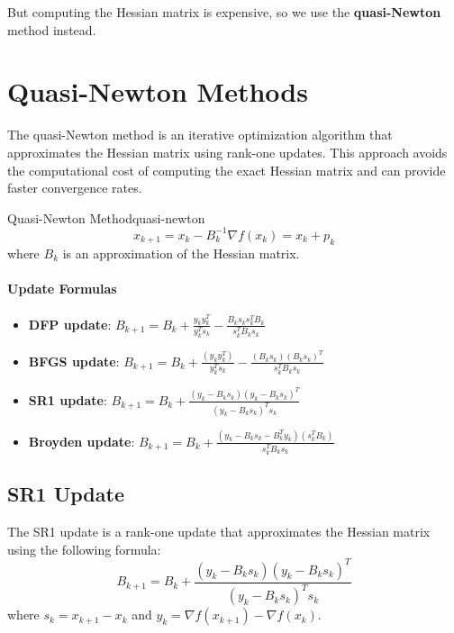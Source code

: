 But computing the Hessian matrix is expensive, so we use the \textbf{quasi-Newton} method instead.

\section*{Quasi-Newton Methods}
The quasi-Newton method is an iterative optimization algorithm that approximates the Hessian matrix using rank-one updates. 
This approach avoids the computational cost of computing the exact Hessian matrix and can provide faster convergence rates.
\begin{definition}{Quasi-Newton Method}{quasi-newton}
    \[
    x_{k+1} = x_k - B_k^{-1} \nabla f(x_k) = x_k + p_k
    \]
    where \( B_k \) is an approximation of the Hessian matrix.
\end{definition}

\begin{algorithm}[H]
  \caption{Quasi-Newton Method}
  \label{alg:quasi-newton}
  \;
  \;
\end{algorithm}

\paragraph{Update Formulas}

\begin{itemize}
  \item \textbf{DFP update}: \( B_{k+1} = B_k + \frac{y_k y_k^T}{y_k^T s_k} - \frac{B_k s_k s_k^T B_k}{s_k^T B_k s_k} \)
  \item \textbf{BFGS update}: \( B_{k+1} = B_k + \frac{(y_k y_k^T)}{y_k^T s_k} - \frac{(B_k s_k)(B_k s_k)^T}{s_k^T B_k s_k} \)
  \item \textbf{SR1 update}: \( B_{k+1} = B_k + \frac{(y_k - B_k s_k)(y_k - B_k s_k)^T}{(y_k - B_k s_k)^T s_k} \)
  \item \textbf{Broyden update}: \( B_{k+1} = B_k + \frac{(y_k - B_k s_k - B_k^T y_k)(s_k^T B_k)}{s_k^T B_k s_k} \)
\end{itemize}

\subsection*{SR1 Update}
The SR1 update is a rank-one update that approximates the Hessian matrix using the following formula:
\[
B_{k+1} = B_k + \frac{(y_k - B_k s_k)(y_k - B_k s_k)^T}{(y_k - B_k s_k)^T s_k}
\]
where \( s_k = x_{k+1} - x_k \) and \( y_k = \nabla f(x_{k+1}) - \nabla f(x_k) \).
